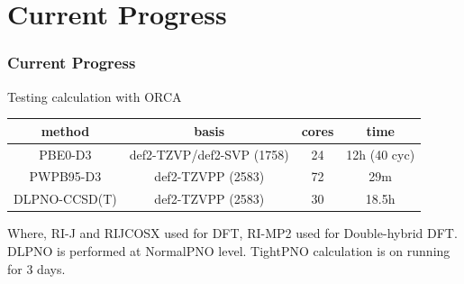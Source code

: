 \documentclass[10pt,aspectratio=43]{beamer}
\numberwithin{equation}{section}
\begin{document}
\section{Current Progress}
\begin{frame}
\frametitle{Current Progress}
Testing calculation with ORCA
\begin{table}
	\centering
	\begin{tabular}{cccc}
		\hline
		method & basis & cores & time\\ \hline
		PBE0-D3 & def2-TZVP/def2-SVP (1758) & 24 & 12h (40 cyc)\\
		PWPB95-D3 & def2-TZVPP (2583) & 72 & 29m\\
		DLPNO-CCSD(T) & def2-TZVPP (2583) & 30 & 18.5h\\
		\hline
	\end{tabular}
\end{table}
Where, RI-J and RIJCOSX used for DFT, RI-MP2 used for Double-hybrid DFT.\\
DLPNO is performed at NormalPNO level. TightPNO calculation is on running for 3 days.
\end{frame}
\fi
\end{document}
